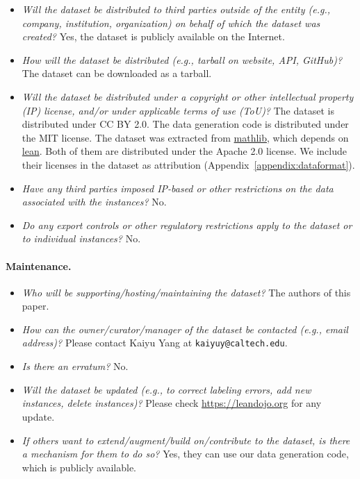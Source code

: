 \documentclass{article}
\newcommand{\weburl}{\url{https://leandojo.org}}
\newcommand{\smallsec}[1]{\vspace{-1mm} \paragraph{#1.}}
\begin{document}
\begin{itemize}[leftmargin=*]

\item \emph{Will the dataset be distributed to third parties outside of the entity (e.g., company, institution, organization) on behalf of which the dataset was created?} Yes, the dataset is publicly available on the Internet.

\item \emph{How will the dataset be distributed (e.g., tarball on website, API, GitHub)?} The dataset can be downloaded as a tarball.

\item \emph{Will the dataset be distributed under a copyright or other intellectual property (IP) license, and/or under applicable terms of use (ToU)?} The dataset is distributed under CC BY 2.0. The data generation code is distributed under the MIT license. The dataset was extracted from \href{https://github.com/leanprover-community/mathlib}{mathlib}, which depends on \href{https://github.com/leanprover-community/lean}{lean}. Both of them are distributed under the Apache 2.0 license. We include their licenses in the dataset as attribution (Appendix~\ref{appendix:dataformat}).

\item \emph{Have any third parties imposed IP-based or other restrictions on the data associated with the instances?} No.

\item \emph{Do any export controls or other regulatory restrictions apply to the dataset or to individual instances?} No.

\end{itemize}

\smallsec{Maintenance}

\begin{itemize}[leftmargin=*]

\item \emph{Who will be supporting/hosting/maintaining the dataset?} The authors of this paper.

\item \emph{How can the owner/curator/manager of the dataset be contacted (e.g., email address)?} Please contact Kaiyu Yang at \texttt{kaiyuy@caltech.edu}.

\item \emph{Is there an erratum?} No.

\item \emph{Will the dataset be updated (e.g., to correct labeling errors, add new instances, delete instances)?} Please check {\weburl} for any update.

\item \emph{If others want to extend/augment/build on/contribute to the dataset, is there a mechanism for them to do so?} Yes, they can use our data generation code, which is publicly available.

\end{itemize}
\end{document}
